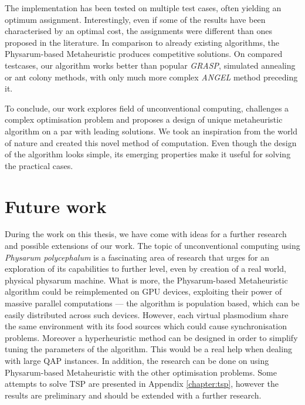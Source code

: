 \documentclass[english,a4paper,twoside]{ppfcmthesis}
\begin{document}
The implementation has been tested on multiple test cases, often yielding an optimum assignment. Interestingly, even if some of the results have been characterised by an optimal cost, the assignments were different than ones proposed in the literature. In comparison to already existing algorithms, the Physarum-based Metaheuristic produces competitive solutions. On compared testcases, our algorithm works better than popular \textit{GRASP}, simulated annealing or ant colony methods, with only much more complex \textit{ANGEL} method preceding it.

To conclude, our work explores field of unconventional computing, challenges a complex optimisation problem and proposes a design of unique metaheuristic algorithm on a par with leading solutions. We took an inspiration from the world of nature and created this novel method of computation. Even though the design of the algorithm looks simple, its emerging properties make it useful for solving the practical cases. 


\section*{Future work}

During the work on this thesis, we have come with ideas for a further research and possible extensions of our work. The topic of unconventional computing using \textit{Physarum polycephalum} is a fascinating area of research that urges for an exploration of its capabilities to further level, even by creation of a real world, physical physarum machine. What is more, the Physarum-based Metaheuristic algorithm could be reimplemented on GPU devices, exploiting their power of massive parallel computations --- the algorithm is population based, which can be easily distributed across such devices. However, each virtual plasmodium share the same environment with its food sources which could cause synchronisation problems. Moreover a hyperheuristic method can be designed in order to simplify tuning the parameters of the algorithm. This would be a real help when dealing with large QAP instances. In addition, the research can be done on using Physarum-based Metaheuristic with the other optimisation problems. Some attempts to solve TSP are presented in Appendix \ref{chapter:tsp}, however the results are preliminary and should be extended with a further research.

\cleardoublepage\appendix
\end{document}
